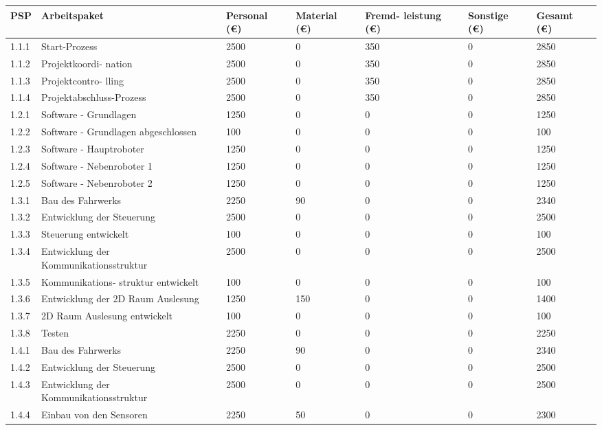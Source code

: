 \begin{longtable}[c]{|p{}|p{3cm}|p{}|p{}|p{2cm}|p{}|p{}|}
\hline
\textbf{PSP} & \textbf{Arbeitspaket} & \textbf{Personal (€)} & \textbf{Material (€)} & \textbf{Fremd-  leistung (€)} & \textbf{Sonstige (€)} & \textbf{Gesamt (€)} \\
\hline
1.1.1 & Start-Prozess & 2500 & 0 & 350 & 0 & 2850 \\
\hline
1.1.2 & Projektkoordi- nation & 2500 & 0 & 350 & 0 & 2850 \\
\hline
1.1.3 & Projektcontro- lling & 2500 & 0 & 350 & 0 & 2850 \\
\hline
1.1.4 & Projektabschluss-Prozess & 2500 & 0 & 350 & 0 & 2850 \\
\hline
1.2.1 & Software - Grundlagen & 1250 & 0 & 0 & 0 & 1250 \\
\hline
1.2.2 & Software - Grundlagen abgeschlossen & 100 & 0 & 0 & 0 & 100 \\
\hline
1.2.3 & Software - Hauptroboter & 1250 & 0 & 0 & 0 & 1250 \\
\hline
1.2.4 & Software - Nebenroboter 1 & 1250 & 0 & 0 & 0 & 1250 \\
\hline
1.2.5 & Software - Nebenroboter 2 & 1250 & 0 & 0 & 0 & 1250 \\
\hline
1.3.1 & Bau des Fahrwerks & 2250 & 90 & 0 & 0 & 2340 \\
\hline
1.3.2 & Entwicklung der Steuerung & 2500 & 0 & 0 & 0 & 2500 \\
\hline
1.3.3 & Steuerung entwickelt & 100 & 0 & 0 & 0 & 100 \\
\hline
1.3.4 & Entwicklung der Kommunikationsstruktur & 2500 & 0 & 0 & 0 & 2500 \\
\hline
1.3.5 & Kommunikations- struktur entwickelt & 100 & 0 & 0 & 0 & 100 \\
\hline
1.3.6 & Entwicklung der 2D Raum Auslesung & 1250 & 150 & 0 & 0 & 1400 \\
\hline
1.3.7 & 2D Raum Auslesung entwickelt & 100 & 0 & 0 & 0 & 100 \\
\hline
1.3.8 & Testen & 2250 & 0 & 0 & 0 & 2250 \\
\hline
1.4.1 & Bau des Fahrwerks & 2250 & 90 & 0 & 0 & 2340 \\
\hline
1.4.2 & Entwicklung der Steuerung & 2500 & 0 & 0 & 0 & 2500 \\
\hline
1.4.3 & Entwicklung der Kommunikationsstruktur & 2500 & 0 & 0 & 0 & 2500 \\
\hline
1.4.4 & Einbau von den Sensoren & 2250 & 50 & 0 & 0 & 2300 \\

\end{longtable}
